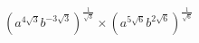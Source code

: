 $(a^{4\sqrt{3}}b^{-3\sqrt{3}})^{\frac{1}{\sqrt{3}}}\times(a^{5\sqrt{6}}b^{2\sqrt{6}})^{\frac{1}{\sqrt{6}}}$
